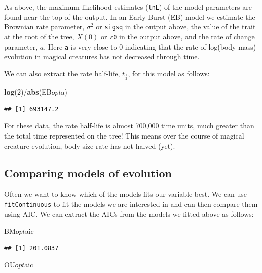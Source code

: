 \documentclass[]{book}
\newenvironment{Shaded}{\begin{snugshade}}{\end{snugshade}}
\newcommand{\KeywordTok}[1]{\textcolor[rgb]{0.13,0.29,0.53}{\textbf{{#1}}}}
\newcommand{\DecValTok}[1]{\textcolor[rgb]{0.00,0.00,0.81}{{#1}}}
\newcommand{\NormalTok}[1]{{#1}}
\begin{document}
As above, the maximum likelihood estimates (\texttt{lnL}) of the model
parameters are found near the top of the output. In an Early Burst (EB)
model we estimate the Brownian rate parameter, \(\sigma^2\) or
\texttt{sigsq} in the output above, the value of the trait at the root
of the tree, \(X(0)\) or \texttt{z0} in the output above, and the rate
of change parameter, \(a\). Here \texttt{a} is very close to 0
indicating that the rate of log(body mass) evolution in magical
creatures has not decreased through time.

We can also extract the rate half-life, \(t_{\frac{1}{2}}\), for this
model as follows:

\begin{Shaded}
\begin{Highlighting}[]
\KeywordTok{log}\NormalTok{(}\DecValTok{2}\NormalTok{)/}\KeywordTok{abs}\NormalTok{(EB$opt$a)}
\end{Highlighting}
\end{Shaded}

\begin{verbatim}
## [1] 693147.2
\end{verbatim}

For these data, the rate half-life is almost 700,000 time units, much
greater than the total time represented on the tree! This means over the
course of magical creature evolution, body size rate has not halved
(yet).

\subsection{Comparing models of
evolution}\label{comparing-models-of-evolution}

Often we want to know which of the models fits our variable best. We can
use \texttt{fitContinuous} to fit the models we are interested in and
can then compare them using AIC. We can extract the AICs from the models
we fitted above as follows:

\begin{Shaded}
\begin{Highlighting}[]
\NormalTok{BM$opt$aic}
\end{Highlighting}
\end{Shaded}

\begin{verbatim}
## [1] 201.0837
\end{verbatim}

\begin{Shaded}
\begin{Highlighting}[]
\NormalTok{OU$opt$aic}
\end{Highlighting}
\end{Shaded}
\end{document}

